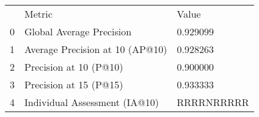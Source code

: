 \begin{tabular}{lll}
 & Metric & Value \\
0 & Global Average Precision & 0.929099 \\
1 & Average Precision at 10 (AP@10) & 0.928263 \\
2 & Precision at 10 (P@10) & 0.900000 \\
3 & Precision at 15 (P@15) & 0.933333 \\
4 & Individual Assessment (IA@10) & RRRRNRRRRR \\
\end{tabular}
